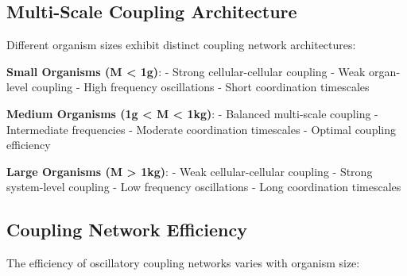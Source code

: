 \documentclass[twocolumn]{article}
\begin{document}
\subsection{Multi-Scale Coupling Architecture}

Different organism sizes exhibit distinct coupling network architectures:

\textbf{Small Organisms (M < 1g)}:
- Strong cellular-cellular coupling
- Weak organ-level coupling  
- High frequency oscillations
- Short coordination timescales

\textbf{Medium Organisms (1g < M < 1kg)}:
- Balanced multi-scale coupling
- Intermediate frequencies
- Moderate coordination timescales
- Optimal coupling efficiency

\textbf{Large Organisms (M > 1kg)}:
- Weak cellular-cellular coupling
- Strong system-level coupling
- Low frequency oscillations  
- Long coordination timescales

\subsection{Coupling Network Efficiency}

The efficiency of oscillatory coupling networks varies with organism size:
\end{document}
